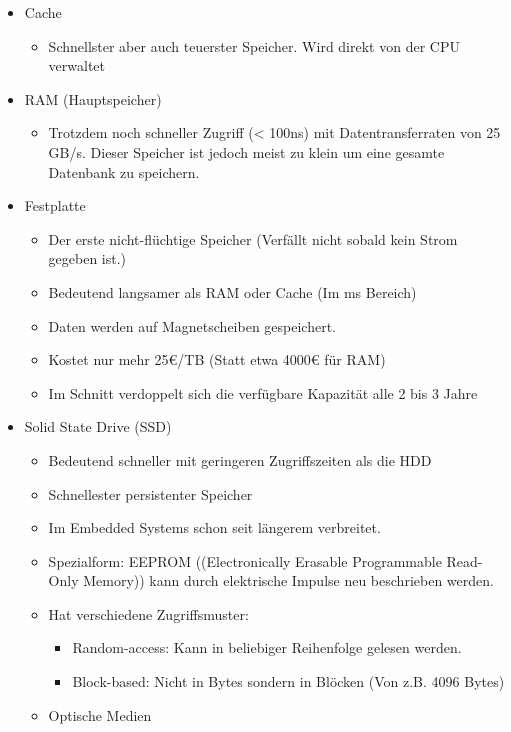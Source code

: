 \documentclass{article}
\begin{document}
	\begin{itemize}
		\item{Cache}
		\begin{itemize}
			\item{Schnellster aber auch teuerster Speicher. Wird direkt von der CPU verwaltet}
		\end{itemize}
		\item{RAM (Hauptspeicher)}
		\begin{itemize}
			\item{Trotzdem noch schneller Zugriff (< 100ns) mit Datentransferraten von 25 GB/s. Dieser Speicher ist jedoch meist zu klein um eine gesamte Datenbank zu speichern.}
		\end{itemize}
		\item{Festplatte}
		\begin{itemize}
			\item{Der erste nicht-flüchtige Speicher (Verfällt nicht sobald kein Strom gegeben ist.)}
			\item{Bedeutend langsamer als RAM oder Cache (Im ms Bereich)}
			\item{Daten werden auf Magnetscheiben gespeichert.}
			\item{Kostet nur mehr 25€/TB (Statt etwa 4000€ für RAM)}
			\item{Im Schnitt verdoppelt sich die verfügbare Kapazität alle 2 bis 3 Jahre}
		\end{itemize}
		\item{Solid State Drive (SSD)}
		\begin{itemize}
			\item{Bedeutend schneller mit geringeren Zugriffszeiten als die HDD}
			\item{Schnellester persistenter Speicher}
			\item{Im Embedded Systems schon seit längerem verbreitet.}
			\item{Spezialform: EEPROM ((Electronically Erasable Programmable Read-Only Memory)) kann durch elektrische Impulse neu beschrieben werden.}
			\item{Hat verschiedene Zugriffsmuster:}
			\begin{itemize}
				\item{Random-access: Kann in beliebiger Reihenfolge gelesen werden.}
				\item{Block-based: Nicht in Bytes sondern in Blöcken (Von z.B. 4096 Bytes)}
			\end{itemize}
			\item{Optische Medien}
			\begin{itemize}

\end{itemize}
\end{itemize}
\end{itemize}
\end{document}
